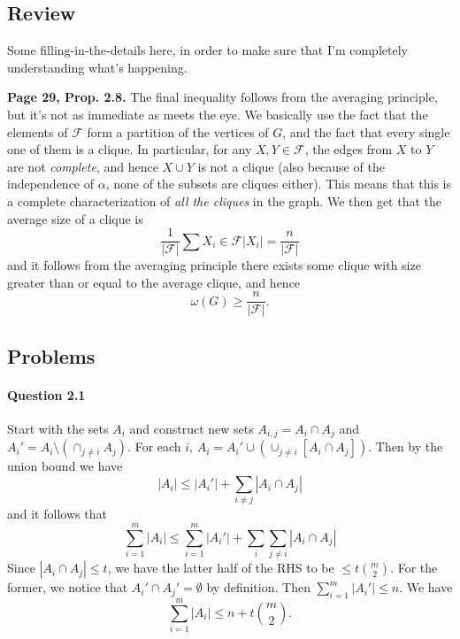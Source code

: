 \subsection{Review}

Some filling-in-the-details here, in order to make sure that I'm completely understanding what's happening.

\textbf{Page 29, Prop. 2.8.} The final inequality follows from the averaging principle, but it's not as immediate as meets the eye. We basically use the fact that the elements of $\mathcal{F}$ form a partition of the vertices of $G$, and the fact that every single one of them is a clique. In particular, for any $X,Y\in\mathcal{F}$, the edges from $X$ to $Y$ are not \textit{complete}, and hence $X\cup Y$ is not a clique (also because of the independence of $\alpha$, none of the subsets are cliques either). This means that this is a complete characterization of \textit{all the cliques} in the graph. We then get that the average size of a clique is
$$\frac{1}{|\mathcal{F}|}\sum{X_i\in\mathcal{F}}|X_i| = \frac{n}{|\mathcal{F}|}$$
and it follows from the averaging principle there exists some clique with size greater than or equal to the average clique, and hence
$$\omega(G)\geq\frac{n}{|\mathcal{F}|}.$$

\textbf{}

\subsection{Problems}

\paragraph{Question 2.1} Start with the sets $A_i$ and construct new sets $A_{i,j}=A_i\cap A_j$ and $A_i' = A_i\setminus(\cap_{j\neq i} A_j)$. For each $i$, $A_i = A_i'\cup (\cup_{j\neq i} [A_i\cap A_j])$. Then by the union bound we have
$$|A_i|\leq |A_i'|+\sum_{i\neq j}|A_i\cap A_j|$$
and it follows that 
$$\sum_{i=1}^m |A_i| \leq \sum_{i=1}^m |A_i'| + \sum_{i}\sum_{j\neq i}|A_i\cap A_j|$$
Since $|A_i\cap A_j|\leq t$, we have the latter half of the RHS to be $\leq t\binom{m}{2}$. For the former, we notice that $A_i'\cap A_j'=\emptyset$ by definition. Then $\sum_{i=1}^m |A_i'|\leq n$. We have
$$\sum_{i=1}^m |A_i|\leq n + t\binom{m}{2}.$$
